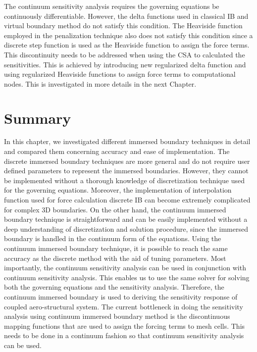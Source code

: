 The continuum sensitivity analysis requires the governing equations be continuously differentiable. However, the delta functions used in classical IB and virtual boundary method do not satisfy this condition. The Heaviside function employed in the penalization technique also does not satisfy this condition since a discrete step function is used as the Heaviside function to assign the force terms. This discontinuity needs to be addressed when using the CSA to calculated the sensitivities. This is achieved by introducing new regularized delta function and using regularized Heaviside functions to assign force terms to computational nodes. This is investigated in more details in the next Chapter.

\section{Summary}
In this chapter, we investigated different immersed boundary techniques in detail and compared them concerning accuracy and ease of implementation. The discrete immersed boundary techniques are more general and do not require user defined parameters to represent the immersed boundaries. However, they cannot be implemented without a thorough knowledge of discretization technique used for the governing equations. Moreover, the implementation of interpolation function used for force calculation discrete IB can become extremely complicated for complex 3D boundaries. On the other hand, the continuum immersed boundary technique is straightforward and can be easily implemented without a deep understanding of discretization and solution procedure, since the immersed boundary is handled in the continuum form of the equations. Using the continuum immersed boundary technique, it is possible to reach the same accuracy as the discrete method with the aid of tuning parameters. Most importantly, the continuum sensitivity analysis can be used in conjunction with continuum sensitivity analysis. This enables us to use the same solver for solving both the governing equations and the sensitivity analysis. Therefore, the continuum immersed boundary is used to deriving the sensitivity response of coupled aero-structural system. The current bottleneck in doing the sensitivity analysis using continuum immersed boundary method is the discontinuous mapping functions that are used to assign the forcing terms to mesh cells. This needs to be done in a continuum fashion so that continuum sensitivity analysis can be used.